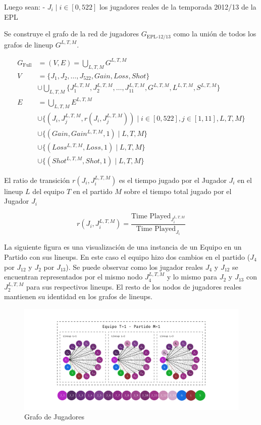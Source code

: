 \documentclass[
  a4paper,
]{article}
\begin{document}
Luego sean: - \(J_i \mid i \in [0, 522]\) los jugadores reales de la
temporada 2012/13 de la EPL

Se construye el grafo de la red de jugadores \(G_{\text{EPL-12/13}}\)
como la unión de todos los grafos de lineup \(G^{L, T, M}\).

\[
\begin{aligned}
   G_{\text{Full}} &= (V, E) = \bigcup_{L, T, M} G^{L, T, M} \\
   V &= \{J_1, J_2, \dots, J_{522}, Gain, Loss, Shot\} \\
    & \cup 
    \bigcup_{L, T, M} \{J_1^{L, T, M}, J_2^{L, T, M}, \dots, J_{11}^{L, T, M}, G^{L, T, M}, L^{L, T, M}, S^{L, T, M}\} \\
   E &= \bigcup_{L, T, M} E^{L, T, M} \\
   & \cup \{(J_i, J_j^{L, T, M}, r(J_i, J_j^{L, T, M})) \mid i \in [0, 522], j \in [1, 11], L, T, M\} \\
    & \cup \{(Gain, Gain^{L, T, M}, 1) \mid L, T, M\} \\
    & \cup \{(Loss^{L, T, M}, Loss, 1) \mid L, T, M\} \\
    & \cup \{(Shot^{L, T, M}, Shot, 1) \mid L, T, M\}
\end{aligned}
\]

El ratio de transición \(r(J_i, J_i^{L, T, M})\) es el tiempo jugado por
el Jugador \(J_i\) en el lineup \(L\) del equipo \(T\) en el partido
\(M\) sobre el tiempo total jugado por el Jugador \(J_i\)

\[
    r(J_i, J_i^{L, T, M}) = \frac{\text{Time Played}_{J_i^{L, T, M}}}{\text{Time Played}_{J_i}}
\]

La siguiente figura es una visualización de una instancia de un Equipo
en un Partido con sus lineups. En este caso el equipo hizo dos cambios
en el partido (\(J_4\) por \(J_{12}\) y \(J_2\) por \(J_{13}\)). Se
puede observar como los jugador reales \(J_4\) y \(J_{12}\) se
encuentran representados por el mismo nodo \(J_4^{L, T, M}\) y lo mismo
para \(J_2\) y \(J_{13}\) con \(J_2^{L, T, M}\) para sus respectivos
lineups. El resto de los nodos de jugadores reales mantienen su
identidad en los grafos de lineups.

\begin{figure}
  \includegraphics{recursos_pdf/graficos/G_TM.png}
    \caption{Grafo de Jugadores}
\end{figure}
\end{document}
